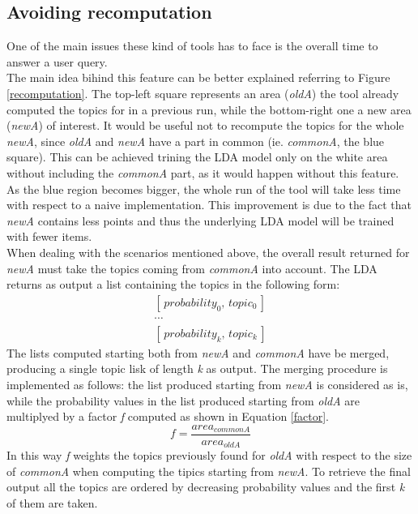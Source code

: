 \documentclass{sig-alternate-05-2015}
\begin{document}
\subsection{Avoiding recomputation}
One of the main issues these kind of tools has to face is the overall time to answer a user query.\\
The main idea bihind this feature can be better explained referring to Figure \ref{recomputation}. The top-left square represents an area (\emph{oldA}) the tool already computed the topics for in a previous run, while the bottom-right one a new area (\emph{newA}) of interest. It would be useful not to recompute the topics for the whole \emph{newA}, since \emph{oldA} and \emph{newA} have a part in common (ie. \emph{commonA}, the blue square). This can be achieved trining the LDA model only on the white area without including the \emph{commonA} part, as it would happen without this feature. As the blue region becomes bigger, the whole run of the tool will take less time with respect to a naive implementation. This improvement is due to the fact that \emph{newA} contains less points and thus the underlying LDA model will be trained with fewer items.\\
When dealing with the scenarios mentioned above, the overall result returned for \emph{newA} must take the topics coming from \emph{commonA} into account. The LDA returns as output a list containing the topics in the following form:
\begin{equation}
    \begin{split}
        [\,probability_0,\,topic_0\,] \\
        \cdots \\
        [\,probability_k,\,topic_k\,]
    \end{split}
\end{equation}
The lists computed starting both from \emph{newA} and \emph{commonA} have be merged, producing a single topic lisk of length \emph{k} as output. The merging procedure is implemented as follows: the list produced starting from \emph{newA} is considered as is, while the probability values in the list produced starting from \emph{oldA} are multiplyed by a factor \emph{f} computed as shown in Equation \ref{factor}.
\begin{equation}\label{factor}
    f = \frac{area_{commonA}}{area_{oldA}}
\end{equation}
In this way \emph{f} weights the topics previously found for \emph{oldA} with respect to the size of \emph{commonA} when computing the tipics starting from \emph{newA}. To retrieve the final output all the topics are ordered by decreasing probability values and  the first \emph{k} of them are taken.
\end{document}

